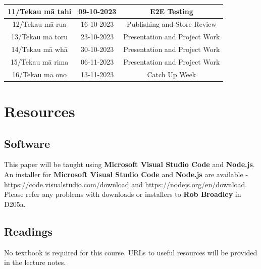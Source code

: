 \documentclass{article}
\begin{document}
\begin{tabular}{|c|c|c|c|}
	\footnotesize 11/Tekau mā tahi & \footnotesize 09-10-2023 & \multicolumn{2}{c|}{\footnotesize E2E Testing}                                                                 \\ \hline
	\footnotesize 12/Tekau mā rua  & \footnotesize 16-10-2023 & \multicolumn{2}{c|}{\footnotesize Publishing and Store Review}                                                                 \\ \hline
	\footnotesize 13/Tekau mā toru & \footnotesize 23-10-2023 & \multicolumn{2}{c|}{\footnotesize Presentation and Project Work}                                                     \\ \hline
	\footnotesize 14/Tekau mā whā  & \footnotesize 30-10-2023 & \multicolumn{2}{c|}{\footnotesize Presentation and Project Work} \\ \hline 
	\footnotesize 15/Tekau mā rima & \footnotesize 06-11-2023 & \multicolumn{2}{c|}{\footnotesize Presentation and Project Work}                                                       \\ \hline
	\footnotesize 16/Tekau mā ono  & \footnotesize 13-11-2023 & \multicolumn{2}{c|}{\footnotesize Catch Up Week}                                                         \\ \hline
\end{tabular}

\section*{Resources}

\subsection*{Software}
This paper will be taught using \textbf{Microsoft Visual Studio Code} and \textbf{Node.js}. An installer for \textbf{Microsoft Visual Studio Code} and \textbf{Node.js} are available - \href{https://code.visualstudio.com/download}{https://code.visualstudio.com/download} and \href{https://nodejs.org/en/download}{https://nodejs.org/en/download}. Please refer any problems with downloads or installers to \textbf{Rob Broadley} in D205a.

\subsection*{Readings}
No textbook is required for this course. URLs to useful resources will be provided in the lecture notes. 
\end{document}
